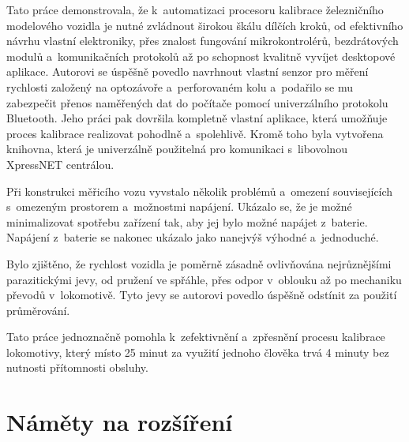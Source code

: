Tato práce demonstrovala, že k~automatizaci procesoru kalibrace železničního
modelového vozidla je nutné zvládnout širokou škálu dílčích kroků, od
efektivního návrhu vlastní elektroniky, přes znalost fungování mikrokontrolérů,
bezdrátových modulů a~komunikačních protokolů až po schopnost kvalitně vyvíjet
desktopové aplikace. Autorovi se úspěšně povedlo navrhnout vlastní senzor pro
měření rychlosti založený na optozávoře a~perforovaném kolu a~podařilo se mu
zabezpečit přenos naměřených dat do počítače pomocí univerzálního protokolu
Bluetooth. Jeho práci pak dovršila kompletně vlastní aplikace, která umožňuje
proces kalibrace realizovat pohodlně a~spolehlivě. Kromě toho byla vytvořena
knihovna, která je univerzálně použitelná pro komunikaci s~libovolnou XpressNET
centrálou.

Při konstrukci měřicího vozu vyvstalo několik problémů a~omezení souvisejících
s~omezeným prostorem a~možnostmi napájení. Ukázalo se, že je možné minimalizovat
spotřebu zařízení tak, aby jej bylo možné napájet z~baterie. Napájení z~baterie
se nakonec ukázalo jako nanejvýš výhodné a~jednoduché.

Bylo zjištěno, že rychlost vozidla je poměrně zásadně ovlivňována nejrůznějšími
parazitickými jevy, od pružení ve spřáhle, přes odpor v~oblouku až po mechaniku
převodů v~lokomotivě. Tyto jevy se autorovi povedlo úspěšně odstínit za použití
průměrování.

Tato práce jednoznačně pomohla k~zefektivnění a~zpřesnění procesu kalibrace
lokomotivy, který místo 25 minut za využití jednoho člověka trvá 4 minuty
bez nutnosti přítomnosti obsluhy.

\section{Náměty na rozšíření}


